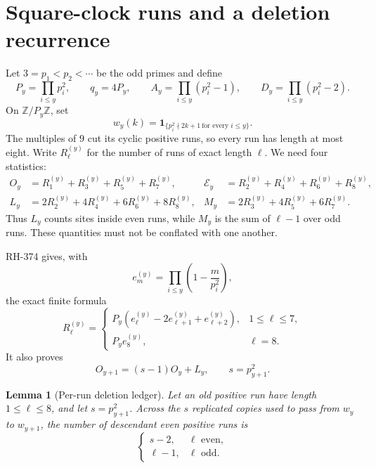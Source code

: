 \documentclass[11pt]{article}
\newtheorem{lemma}[theorem]{Lemma}
\theoremstyle{definition}
\theoremstyle{remark}
\newcommand{\Ecal}{\mathcal E}
\newcommand{\Z}{\mathbb Z}
\begin{document}
\section{Square-clock runs and a deletion recurrence}

Let $3=p_1<p_2<\cdots$ be the odd primes and define
\begin{equation}
 P_y=\prod_{i\le y}p_i^2,\qquad q_y=4P_y,\qquad
 A_y=\prod_{i\le y}(p_i^2-1),\qquad
 D_y=\prod_{i\le y}(p_i^2-2).
 \label{eq:square-parameters}
\end{equation}
On $\Z/P_y\Z$, set
\begin{equation}
 w_y(k)=\mathbf1_{\{p_i^2\nmid 2k+1\ \text{for every }i\le y\}}.
 \label{eq:support-word}
\end{equation}
The multiples of $9$ cut its cyclic positive runs, so every run has length
at most eight.  Write $R_\ell^{(y)}$ for the number of runs of exact length
$\ell$.  We need four statistics:
\begin{align}
 O_y&=R_1^{(y)}+R_3^{(y)}+R_5^{(y)}+R_7^{(y)},
 &\Ecal_y&=R_2^{(y)}+R_4^{(y)}+R_6^{(y)}+R_8^{(y)},
 \label{eq:OE}\\
 L_y&=2R_2^{(y)}+4R_4^{(y)}+6R_6^{(y)}+8R_8^{(y)},
 &M_y&=2R_3^{(y)}+4R_5^{(y)}+6R_7^{(y)}.
 \label{eq:LM}
\end{align}
Thus $L_y$ counts sites inside even runs, while $M_y$ is the sum of
$\ell-1$ over odd runs.  These quantities must not be conflated with one
another.

RH-374 gives, with
\[
 e_m^{(y)}=\prod_{i\le y}\left(1-\frac{m}{p_i^2}\right),
\]
the exact finite formula
\begin{equation}
 R_\ell^{(y)}=
 \begin{cases}
 P_y(e_\ell^{(y)}-2e_{\ell+1}^{(y)}+e_{\ell+2}^{(y)}),&1\le\ell\le7,\\
 P_y e_8^{(y)},&\ell=8.
 \end{cases}
 \label{eq:run-formula}
\end{equation}
It also proves
\begin{equation}
 O_{y+1}=(s-1)O_y+L_y,\qquad s=p_{y+1}^2.
 \label{eq:odd-recurrence}
\end{equation}

\begin{lemma}[Per-run deletion ledger]
\label{lem:deletion}
Let an old positive run have length $1\le\ell\le8$, and let
$s=p_{y+1}^2$.  Across the $s$ replicated copies used to pass from
$w_y$ to $w_{y+1}$, the number of descendant even positive runs is
\begin{equation}
 \begin{cases}
 s-2,&\ell\text{ even},\\
 \ell-1,&\ell\text{ odd}.
 \end{cases}
 \label{eq:per-run-ledger}
\end{equation}
\end{lemma}
\end{document}
